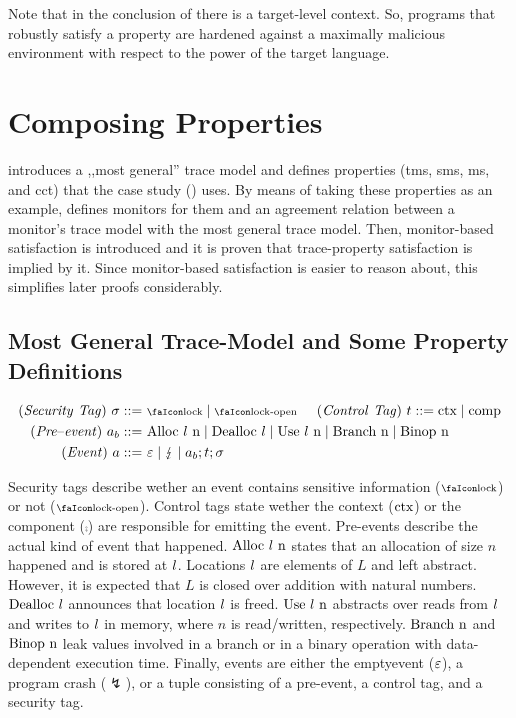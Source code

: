 \documentclass[acmsmall,review,screen,dvipsnames]{acmart}
\begin{document}
Note that in the conclusion of  there is a target-level context.
So, programs that robustly satisfy a property are hardened against a maximally malicious environment with respect to the power of the target language.

\section{Composing Properties}\label{sec:compprop}
 introduces a ,,most general'' trace model and defines properties (\gls{tms}, \gls{sms}, \gls{ms}, and \gls{cct}) that the case study () uses.
By means of taking these properties as an example,  defines monitors for them and an agreement relation between a monitor's trace model with the most general trace model.
Then, monitor-based satisfaction is introduced and it is proven that trace-property satisfaction is implied by it.
Since monitor-based satisfaction is easier to reason about, this simplifies later proofs considerably.

\subsection{Most General Trace-Model and Some Property Definitions}\label{subsec:propdefs}

\begin{gather*}
  \begin{aligned}
  \mi{(Security\ Tag)}~\sigma\bnfdef&\ \lock \mid \unlock\hspace{0.5cm}
  \mi{(Control\ Tag)}~\sandboxtag\bnfdef \ctx\mid\comp\\
  \mi{(Pre\text{--}event)}~\event[_{b}]\bnfdef&\ \ev{Alloc\ \loc\ n} \mid \ev{Dealloc\ \loc} \mid \ev{Use\ \loc\ n} \mid \ev{Branch\ n} \mid \ev{Binop\ n} \\
  \mi{(Event)}~\event\bnfdef&\ \emptyevent \mid \lightning \mid \event[_{b}];\sandboxtag;\sigma \\
  \end{aligned}
\end{gather*}

Security tags describe wether an event contains sensitive information ($\lock$) or not ($\unlock$).
Control tags state wether the context ($\text{ctx}$) or the component ($\comp$) are responsible for emitting the event.
Pre-events describe the actual kind of event that happened.
$\ev{Alloc\ \loc\ n}$ states that an allocation of size $n$ happened and is stored at $l$.
Locations $l$ are elements of $L$ and left abstract.
However, it is expected that $L$ is closed over addition with natural numbers.
$\text{Dealloc\ \ensuremath l}$ announces that location $l$ is freed.
$\text{Use\ \ensuremath l\ n}$ abstracts over reads from $l$ and writes to $l$ in memory, where $n$ is read/written, respectively.
$\ev{Branch\ n}$ and $\text{Binop\ n}$ leak values involved in a branch or in a binary operation with data-dependent execution time.
Finally, events are either the emptyevent ($\varepsilon$), a program crash ($\lightning$), or a tuple consisting of a pre-event, a control tag, and a security tag.
\end{document}

